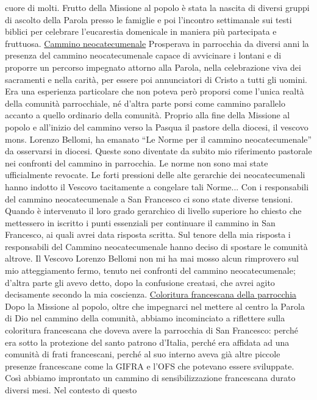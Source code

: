 cuore di molti. Frutto della Missione al popolo è stata la nascita di diversi gruppi di ascolto della 
Parola presso le famiglie e poi l'incontro settimanale sui testi biblici per celebrare l'eucarestia 
domenicale in maniera più partecipata e fruttuosa.
\bigbreak
{}
\underline{Cammino neocatecumenale}
\medbreak
Prosperava in parrocchia da diversi anni la presenza del cammino neocatecumenale capace 
di avvicinare i lontani e di proporre un percorso impegnato attorno alla Parola, nella celebrazione 
viva dei sacramenti e nella carità, per essere poi annunciatori di Cristo a tutti gli uomini. Era una 
esperienza particolare che non poteva però proporsi come l'unica realtà della comunità parrocchiale, 
né d'altra parte porsi come cammino parallelo accanto a quello ordinario della comunità. 
Proprio alla fine della Missione al popolo e all'inizio del cammino verso la Pasqua il pastore 
della diocesi, il vescovo mons. Lorenzo Bellomi, ha emanato “Le Norme per il cammino 
neocatecumenale” da osservarsi in diocesi. Queste sono diventate da subito mio riferimento 
pastorale nei confronti del cammino in parrocchia. Le norme non sono mai state ufficialmente 
revocate. Le forti pressioni delle alte gerarchie dei neocatecumenali hanno indotto il Vescovo 
tacitamente a congelare tali Norme...
Con i responsabili del cammino neocatecumenale a San Francesco ci sono state diverse tensioni. 
Quando è intervenuto il loro grado gerarchico di livello superiore ho chiesto che mettessero in 
iscritto i punti essenziali per continuare il cammino in San Francesco, ai quali avrei data risposta 
scritta. Sul tenore della mia risposta i responsabili del Cammino neocatecumenale hanno deciso di 
spostare le comunità altrove. Il Vescovo Lorenzo Bellomi non mi ha mai mosso alcun rimprovero 
sul mio atteggiamento fermo, tenuto nei confronti del cammino neocatecumenale; d'altra parte gli 
avevo detto, dopo la confusione creatasi, che avrei agito decisamente secondo la mia coscienza.
\bigbreak
{}
\underline{Coloritura francescana della parrocchia}
\medbreak
Dopo la Missione al popolo, oltre che impegnarci nel mettere al centro la Parola di Dio nel 
cammino della comunità, abbiamo incominciato a riflettere sulla coloritura francescana che doveva 
avere la parrocchia di San Francesco: perché era sotto la protezione del santo patrono d'Italia,  
perché era affidata ad una comunità di frati francescani, perché al suo interno aveva già altre piccole 
presenze francescane come la GIFRA e l'OFS che potevano essere sviluppate. Così abbiamo 
improntato un cammino di sensibilizzazione francescana durato diversi mesi. Nel contesto di questo 
